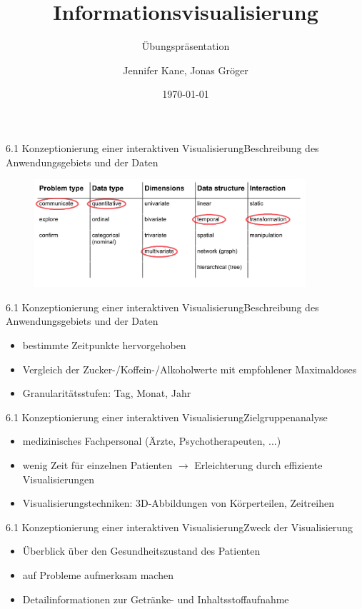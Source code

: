 \documentclass[%
11pt,a4paper,xcolor={usenames,dvipsnames}]{beamer}
\author{Jennifer Kane, Jonas Gröger}
\date{\today}
\begin{document}
    \begin{frame}[plain]
    \title{Informationsvisualisierung}
	\subtitle{Übungspräsentation}
	\titlepage
    \end{frame}
    
       \begin{frame}{6.1 Konzeptionierung einer interaktiven Visualisierung}{Beschreibung des Anwendungsgebiets und der Daten}
        \begin{figure}
    		\centering
    		\includegraphics[height=4cm]{includes/datentypen}
		\end{figure}
    \end{frame}

    \begin{frame}{6.1 Konzeptionierung einer interaktiven Visualisierung}{Beschreibung des Anwendungsgebiets und der Daten}
        \begin{itemize}
            \item bestimmte Zeitpunkte hervorgehoben
            \item Vergleich der Zucker-/Koffein-/Alkoholwerte mit empfohlener Maximaldoses
            \item Granularitätsstufen: Tag, Monat, Jahr
        \end{itemize}
    \end{frame}

    \begin{frame}{6.1 Konzeptionierung einer interaktiven Visualisierung}{Zielgruppenanalyse}
        \begin{itemize}
            \item medizinisches Fachpersonal (Ärzte, Psychotherapeuten, ...)
            \item wenig Zeit für einzelnen Patienten $\rightarrow$ Erleichterung durch effiziente Visualisierungen
            \item Visualisierungstechniken: 3D-Abbildungen von Körperteilen, Zeitreihen
        \end{itemize}
    \end{frame}

    \begin{frame}{6.1 Konzeptionierung einer interaktiven Visualisierung}{Zweck der Visualisierung}
        \begin{itemize}
            \item Überblick über den Gesundheitszustand
des Patienten
			\item auf Probleme aufmerksam machen
			\item Detailinformationen zur Getränke- und Inhaltsstoffaufnahme
        \end{itemize}
    \end{frame}
\end{document}
